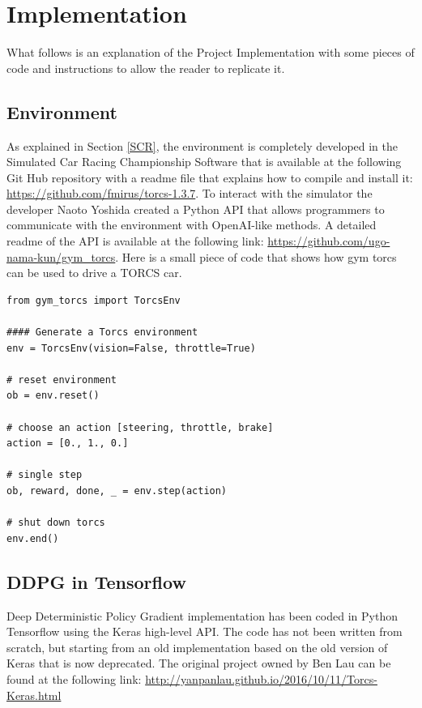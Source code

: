 \documentclass[binding=0.6cm,Lau,oneside]{sapthesis} %
\begin{document}
\chapter{Implementation}
What follows is an explanation of the Project Implementation with some pieces of code and instructions to allow the reader to replicate it.
\section{Environment}
As explained in Section \ref{SCR}, the environment is completely developed in the Simulated Car Racing Championship Software that is available at the following Git Hub repository with a readme file that explains how to compile and install it: \url{https://github.com/fmirus/torcs-1.3.7}.
To interact with the simulator the developer Naoto Yoshida created a Python API that allows programmers to communicate with the environment with OpenAI-like methods. A detailed readme of the API is available at the following link: \url{https://github.com/ugo-nama-kun/gym_torcs}.
Here is a small piece of code that shows how gym torcs can be used to drive a TORCS car.

\begin{lstlisting}
from gym_torcs import TorcsEnv

#### Generate a Torcs environment
env = TorcsEnv(vision=False, throttle=True)

# reset environment
ob = env.reset()

# choose an action [steering, throttle, brake]
action = [0., 1., 0.]

# single step
ob, reward, done, _ = env.step(action)

# shut down torcs
env.end()
\end{lstlisting}
\section{DDPG in Tensorflow}
Deep Deterministic Policy Gradient implementation has been coded in Python Tensorflow using the Keras high-level API. The code has not been written from scratch, but starting from an old implementation based on the old version of Keras that is now deprecated. The original project owned by Ben Lau can be found at the following link: \url{http://yanpanlau.github.io/2016/10/11/Torcs-Keras.html}
\end{document}
